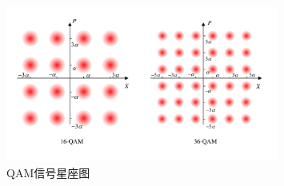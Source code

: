\begin{figure}
\centering
  \includegraphics[width=0.8\textwidth]{figures/chap3/QAM-signals}
  \caption{QAM信号星座图}
  \label{fig:QAM-signals}
\end{figure}


